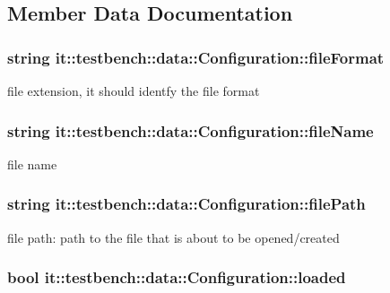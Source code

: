 \subsection{Member Data Documentation}
\hypertarget{structit_1_1testbench_1_1data_1_1Configuration_ac330dcc08b99860e1eee0cf0b4b56f6e}{
\subsubsection[{file\-Format}]{\setlength{\rightskip}{0pt plus 5cm}string it\-::testbench\-::data\-::\-Configuration\-::file\-Format}}\label{d1/d49/structit_1_1testbench_1_1data_1_1Configuration_ac330dcc08b99860e1eee0cf0b4b56f6e}
file extension, it should identfy the file format \hypertarget{structit_1_1testbench_1_1data_1_1Configuration_ae735a3eb50052a1a6373cf1bd6fbcba0}{
\subsubsection[{file\-Name}]{\setlength{\rightskip}{0pt plus 5cm}string it\-::testbench\-::data\-::\-Configuration\-::file\-Name}}\label{d1/d49/structit_1_1testbench_1_1data_1_1Configuration_ae735a3eb50052a1a6373cf1bd6fbcba0}
file name \hypertarget{structit_1_1testbench_1_1data_1_1Configuration_ae62b44b93e9d068adadf3b307933ee97}{
\subsubsection[{file\-Path}]{\setlength{\rightskip}{0pt plus 5cm}string it\-::testbench\-::data\-::\-Configuration\-::file\-Path}}\label{d1/d49/structit_1_1testbench_1_1data_1_1Configuration_ae62b44b93e9d068adadf3b307933ee97}
file path\-: path to the file that is about to be opened/created \hypertarget{structit_1_1testbench_1_1data_1_1Configuration_a515b1b8394fa1e8e1b7cd3aa721a873e}{
\subsubsection[{loaded}]{\setlength{\rightskip}{0pt plus 5cm}bool it\-::testbench\-::data\-::\-Configuration\-::loaded}}\label{d1/d49/structit_1_1testbench_1_1data_1_1Configuration_a515b1b8394fa1e8e1b7cd3aa721a873e}
